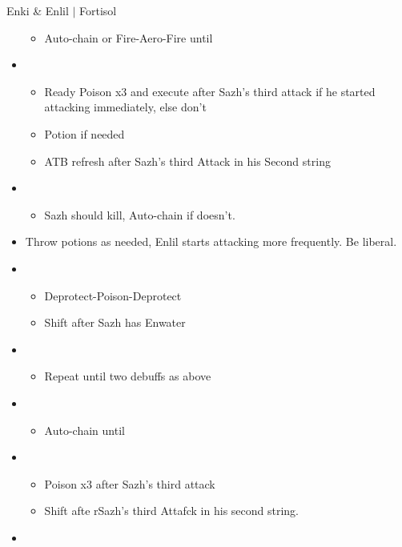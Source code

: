 \begin{battle}{Enki \& Enlil $|$ Fortisol}
\begin{multicols}{2}
\begin{itemize}
\begin{itemize}
              \item Auto-chain or Fire-Aero-Fire until \stagger
            \end{itemize}
      \item \sixth
            \begin{itemize}
              \item Ready Poison x3 and execute after Sazh's third attack if he started attacking immediately, else don't
              \item Potion if needed
              \item ATB refresh after Sazh's third Attack in his Second string
            \end{itemize}
      \item \first
            \begin{itemize}
              \item Sazh should kill, Auto-chain if doesn't.
            \end{itemize}
      \item Throw potions as needed, Enlil starts attacking more frequently. Be liberal.
      \item \third
            \begin{itemize}
              \item Deprotect-Poison-Deprotect
              \item Shift after Sazh has Enwater
            \end{itemize}
      \item \fifth
            \begin{itemize}
              \item Repeat until two debuffs as above
            \end{itemize}
      \item \fourth
            \begin{itemize}
              \item Auto-chain until \stagger
            \end{itemize}
      \item \sixth
            \begin{itemize}
              \item Poison x3 after Sazh's third attack
              \item Shift afte rSazh's third Attafck in his second string.
            \end{itemize}
      \item \first
            \begin{itemize}

\end{itemize}
\end{itemize}
\end{multicols}
\end{battle}
